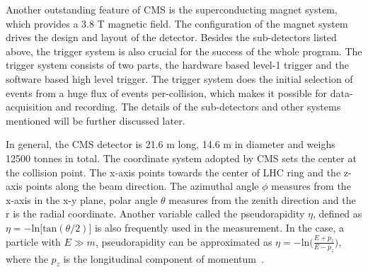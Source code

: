 
Another outstanding feature of CMS is the superconducting magnet system, which provides a 3.8 T magnetic field. The configuration of the magnet system drives the design and layout of the detector. Besides the sub-detectors listed above, the trigger system is also crucial for the success of the whole program. The trigger system consists of two parts, the hardware based level-1 trigger and the software based high level trigger. The trigger system does the initial selection of events from a huge flux of events per-collision, which makes it possible for data-acquisition and recording. The details of the sub-detectors and other systems mentioned will be further discussed later. 

In general, the CMS detector is 21.6 m long, 14.6 m in diameter and weighs 12500 tonnes in total. The coordinate system adopted by CMS sets the center at the collision point. The x-axis points towards the center of LHC ring and the z-axis points along the beam direction. The azimuthal angle $\phi$  measures from the x-axis in the x-y plane, polar angle $\theta$ measures from the zenith direction  and the r is the radial coordinate. Another variable called the pseudorapidity $\eta$, defined as $\eta=-\textrm{ln}\big[\textrm{tan}(\theta/2)\big]$ is also frequently used in the measurement. In the case, a particle with $E\gg m$, pseudorapidity can be approximated as $\eta=-\textrm{ln}\big(\frac{E+p_{z}}{E-p_{z}}\big)$, where the $p_{z}$ is the longitudinal component of momentum~\cite{CMS_experiment}. 

